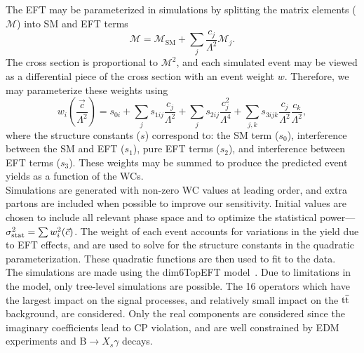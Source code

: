 \documentclass[12pt]{article}
\begin{document}
The EFT may be parameterized in simulations by splitting the matrix elements ($\mathcal{M}$) into SM and EFT terms
\begin{equation}
	\mathcal{M} = \mathcal{M}_{\mathrm{SM}} + \sum_{j} \frac{c_j}{\Lambda^2} \mathcal{M}_j.
\end{equation}
The cross section is proportional to $\mathcal{M}^2$, and each simulated event may be viewed as a differential piece of the cross section with an event weight $w$. Therefore, we may parameterize these weights using
\begin{equation}
	w_i\left(\frac{\vec{c}}{\Lambda^2}\right) = s_{0i} + \sum_js_{1ij}\frac{c_j}{\Lambda^2} + \sum_js_{2ij}\frac{c_j^2}{\Lambda^4} + \sum_{j,k}s_{3ijk} \frac{c_j}{\Lambda^2} \frac{c_k}{\Lambda^2},
\end{equation}
where the structure constants ($s$) correspond to: the SM term ($s_0$), interference between the SM and EFT ($s_1$), pure EFT terms ($s_2$), and interference between EFT terms ($s_3$). These weights may be summed to produce the predicted event yields as a function of the WCs.\\

Simulations are generated with non-zero WC values at leading order, and extra partons are included when possible to improve our sensitivity. Initial values are chosen to include all relevant phase space and to optimize the statistical power---$\sigma^2_{\mathrm{stat}} = \sum w^2_i(\vec{c})$. The weight of each event accounts for variations in the yield due to EFT effects, and are used to solve for the structure constants in the quadratic parameterization. These quadratic functions are then used to fit to the data.\\

The simulations are made using the dim6TopEFT model~\cite{AguilarSaavedra:2018nen}. %
Due to limitations in the model, only tree-level simulations are possible. The 16 operators which have the largest impact on the signal processes, and relatively small impact on the $\mathrm{t\overline{t}}$ background, are considered. Only the real components are considered since the imaginary coefficients lead to CP violation, and are well constrained by EDM experiments and $\mathrm{B} \to X_s \gamma$ decays.
\end{document}
